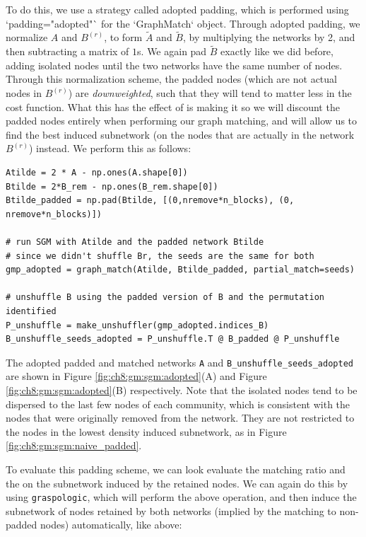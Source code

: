 To do this, we use a strategy called adopted padding, which is performed using `padding="adopted"` for the `GraphMatch` object. Through adopted padding, we normalize $A$ and $B^{(r)}$, to form $\tilde A$ and $\tilde B$, by multiplying the networks by 2, and then subtracting a matrix of $1$s. We again pad $\tilde B$ exactly like we did before, adding isolated nodes until the two networks have the same number of nodes. Through this normalization scheme, the padded nodes (which are not actual nodes in $B^{(r)}$) are \textit{downweighted}, such that they will tend to matter less in the cost function. What this has the effect of is making it so we will discount the padded nodes entirely when performing our graph matching, and will allow us to find the best induced subnetwork (on the nodes that are actually in the network $B^{(r)}$) instead. We perform this as follows:

\begin{lstlisting}[style=python]
Atilde = 2 * A - np.ones(A.shape[0])
Btilde = 2*B_rem - np.ones(B_rem.shape[0])
Btilde_padded = np.pad(Btilde, [(0,nremove*n_blocks), (0, nremove*n_blocks)])

# run SGM with Atilde and the padded network Btilde
# since we didn't shuffle Br, the seeds are the same for both
gmp_adopted = graph_match(Atilde, Btilde_padded, partial_match=seeds)

# unshuffle B using the padded version of B and the permutation identified
P_unshuffle = make_unshuffler(gmp_adopted.indices_B)
B_unshuffle_seeds_adopted = P_unshuffle.T @ B_padded @ P_unshuffle
\end{lstlisting}

The adopted padded and matched networks \texttt{A} and \texttt{B\_unshuffle\_seeds\_adopted} are shown in Figure \ref{fig:ch8:gm:sgm:adopted}(A) and Figure \ref{fig:ch8:gm:sgm:adopted}(B) respectively. Note that the isolated nodes tend to be dispersed to the last few nodes of each community, which is consistent with the nodes that were originally removed from the network. They are not restricted to the nodes in the lowest density induced subnetwork, as in Figure \ref{fig:ch8:gm:sgm:naive_padded}.

To evaluate this padding scheme, we can look evaluate the matching ratio and the on the subnetwork induced by the retained nodes. We can again do this by using \texttt{graspologic}, which will perform the above operation, and then induce the subnetwork of nodes retained by both networks (implied by the matching to non-padded nodes) automatically, like above:

